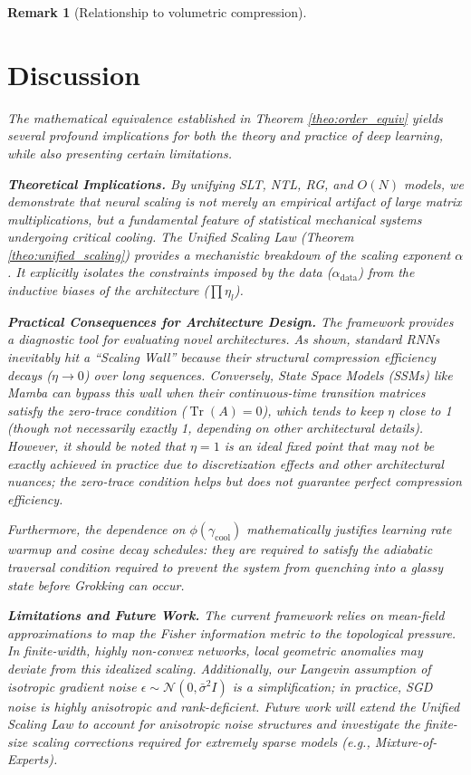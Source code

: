 \documentclass[11pt, a4paper]{article}
\theoremstyle{plain}
\newtheorem*{remark}{Remark}
\DeclareMathOperator{\Tr}{Tr}
\begin{document}
\begin{remark}[Relationship to volumetric compression]
\section{Discussion}

The mathematical equivalence established in Theorem \ref{theo:order_equiv} yields several profound implications for both the theory and practice of deep learning, while also presenting certain limitations.

\textbf{Theoretical Implications.} By unifying SLT, NTL, RG, and $O(N)$ models, we demonstrate that neural scaling is not merely an empirical artifact of large matrix multiplications, but a fundamental feature of statistical mechanical systems undergoing critical cooling. The Unified Scaling Law (Theorem \ref{theo:unified_scaling}) provides a mechanistic breakdown of the scaling exponent $\alpha$. It explicitly isolates the constraints imposed by the data ($\alpha_{\text{data}}$) from the inductive biases of the architecture ($\prod \eta_l$).

\textbf{Practical Consequences for Architecture Design.} The framework provides a diagnostic tool for evaluating novel architectures. As shown, standard RNNs inevitably hit a ``Scaling Wall'' because their structural compression efficiency decays ($\eta \to 0$) over long sequences. Conversely, State Space Models (SSMs) like Mamba \citep{gu2023mamba} can bypass this wall when their continuous-time transition matrices satisfy the zero-trace condition ($\Tr(A)=0$), which tends to keep $\eta$ close to 1 (though not necessarily exactly 1, depending on other architectural details). However, it should be noted that $\eta=1$ is an ideal fixed point that may not be exactly achieved in practice due to discretization effects and other architectural nuances; the zero-trace condition helps but does not guarantee perfect compression efficiency.

Furthermore, the dependence on $\phi(\gamma_{\text{cool}})$ mathematically justifies learning rate warmup and cosine decay schedules: they are required to satisfy the adiabatic traversal condition required to prevent the system from quenching into a glassy state before Grokking can occur.

\textbf{Limitations and Future Work.} The current framework relies on mean-field approximations to map the Fisher information metric to the topological pressure. In finite-width, highly non-convex networks, local geometric anomalies may deviate from this idealized scaling. Additionally, our Langevin assumption of isotropic gradient noise $\epsilon \sim \mathcal{N}(0, \bar{\sigma}^2 I)$ is a simplification; in practice, SGD noise is highly anisotropic and rank-deficient. Future work will extend the Unified Scaling Law to account for anisotropic noise structures and investigate the finite-size scaling corrections required for extremely sparse models (e.g., Mixture-of-Experts).


\end{remark}
\end{document}
